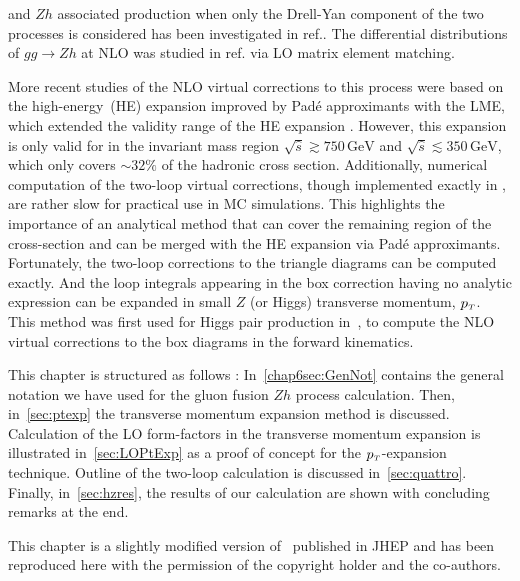 and $ Z h$ associated production when only the Drell-Yan component of the two processes is considered has been investigated in ref.\cite{Harlander:2018yns}. The differential distributions of $g g \rightarrow Zh$  at NLO was studied in ref.\cite{Hespel:2015zea} via LO matrix element matching. 
\par More recent studies of the NLO virtual corrections to this process were based on the high-energy~(HE) expansion improved by Pad\'e approximants with the LME, which extended the validity range of the HE expansion \cite{Davies:2020drs}. However, this expansion is only valid for in the invariant mass region $\sqrt{\hat{s}}  \gtrsim 750\, \si{\GeV} $ and $\sqrt{\hat{s}}  \lesssim 350\,  \si{\GeV}$,  which only covers $\sim 32\%$ of the hadronic cross section. Additionally, numerical computation of the two-loop virtual corrections, though implemented exactly in  \cite{Chen:2020gae}, are rather slow for practical use in MC simulations.  This highlights the importance of an analytical method that can cover the remaining region of the cross-section and can be merged with the HE expansion via Pad\'e approximants. Fortunately, the two-loop corrections to the triangle diagrams can be computed exactly. And the loop integrals appearing in the box correction having no analytic expression can be expanded in small  $Z$ (or Higgs) 
transverse momentum, $p_{\scriptscriptstyle T}$. This method was first used for Higgs pair production in~\cite{Bonciani:2018omm}, to compute the NLO virtual corrections to the box diagrams in the forward kinematics. 
\par This chapter is structured as follows : In~\autoref{chap6sec:GenNot} contains the general notation we have used for the gluon fusion $Zh$ process calculation. Then, in~\autoref{sec:ptexp} the transverse momentum expansion method is discussed.  Calculation of the LO form-factors in the transverse momentum expansion is illustrated in~\autoref{sec:LOPtExp} as a proof of concept for the $p_{\scriptscriptstyle T}$-expansion technique. Outline of the two-loop calculation is discussed in~\autoref{sec:quattro}. Finally, in~\autoref{sec:hzres}, the results of our calculation are shown with concluding remarks at the end. 
\par This chapter is a slightly modified version of~\cite{Alasfar:2021ppe} published in JHEP and has been reproduced here with the permission of the copyright holder and the co-authors.
